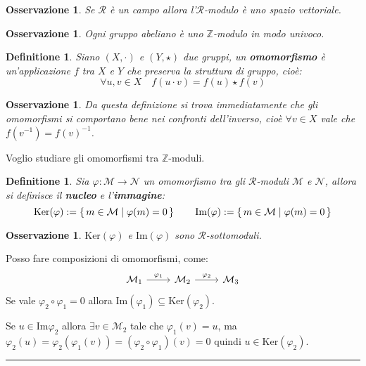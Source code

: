 \documentclass{article}
\newtheorem{osservation}[theorem]{Osservazione}
\newtheorem{definition}[theorem]{Definitione}
\newenvironment{proof}{{\bf Dimostrazione:}}{\hfill\rule{2mm}{2mm}}
\newcommand{\R}{\mathcal{R}}
\newcommand{\M}{\mathcal{M}}
\newcommand{\N}{\mathcal{N}}
\newcommand{\Z}{\mathbb{Z}}
\newcommand{\im}{\mathrm{Im}}
\renewcommand{\ker}{\mathrm{Ker}}
\renewcommand{\phi}{\varphi}
\begin{document}

\begin{osservation}
  Se $ \R $ è un campo allora l'$ \R $-modulo è uno spazio vettoriale.
\end{osservation}

\begin{osservation}
  Ogni gruppo abeliano è uno $ \Z $-modulo in modo univoco.
\end{osservation}

\begin{definition}
  Siano $ (X, \cdot) $ e $ (Y, \star) $ due gruppi, un \textbf{omomorfismo} è un'applicazione $ f $
  tra $ X $ e $ Y $ che preserva la struttura di gruppo, cioè:
  \[
    \forall u,v \in X \quad f(u \cdot v) = f(u) \star f(v)
  \]
\end{definition}

\begin{osservation}
  Da questa definizione si trova immediatamente che gli omomorfismi si comportano bene nei
  confronti dell'inverso, cioè $ \forall v \in X $ vale che $ f(v^{-1}) = {f(v)}^{-1} $.
\end{osservation}

Voglio studiare gli omomorfismi tra $ \Z $-moduli.

\begin{definition}
  Sia $ \phi: \M \to \N $ un omomorfismo tra gli $ \R $-moduli $ \M $ e $ \N $,
  allora si definisce il \textbf{nucleo} e l'\textbf{immagine}:
  \[
    \ker (\phi) := \set{ m \in \M | \phi(m) = 0}  \qquad  \im (\phi) := \set{ m \in \M | \phi(m) = 0}
  \]
\end{definition}

\begin{osservation}
  $ \ker (\phi) $ e $ \im (\phi) $ sono $ \R $-sottomoduli.
\end{osservation}

Posso fare composizioni di omomorfismi, come:
\[
  \begin{tikzcd}
    \M_1 \arrow{r}{\phi_1} & \M_2 \arrow{r}{\phi_2} & \M_3
  \end{tikzcd}
\]
Se vale $ \phi_2 \circ \phi_1 = 0 $ allora $ \im (\phi_1) \subseteq \ker (\phi_2) $.

\begin{proof}
  Se $ u \in \im {\phi_2} $ allora $ \exists v \in \M_2 $ tale che $ \phi_1(v) = u $,
  ma $ \phi_2(u) = \phi_2(\phi_1(v)) = (\phi_2 \circ \phi_1)(v) = 0 $ quindi $ u \in \ker(\phi_2) $.
\end{proof}
\end{document}
